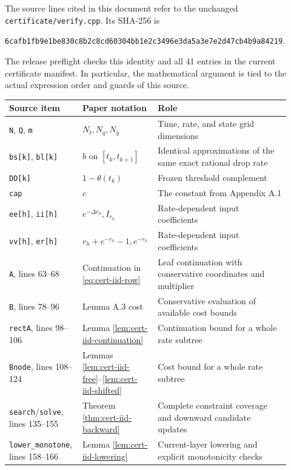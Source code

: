 The source lines cited in this document refer to the unchanged
\texttt{certificate/verify.cpp}. Its SHA-256 is
\begin{center}
\small\texttt{6cafb1fb9e1be830c8b2c8cd60304bb1e2c3496e3da5a3e7e2d47cb4b9a84219}.
\end{center}
The release preflight checks this identity and all 41 entries in the
current certificate manifest. In particular, the mathematical argument is tied to
the actual expression order and guards of this source.

\begin{longtable}{@{}p{0.25\linewidth}p{0.21\linewidth}p{0.46\linewidth}@{}}
\toprule
Source item & Paper notation & Role\\
\midrule
\endhead
\texttt{N}, \texttt{Q}, \texttt{m} & $N_t,N_q,N_y$ & Time, rate, and state grid dimensions\\
\texttt{bs[k]}, \texttt{bl[k]} & $b$ on $[t_k,t_{k+1}]$ & Identical approximations of the same exact rational drop rate\\
\texttt{DD[k]} & $1-\theta(t_k)$ & Frozen threshold complement\\
\texttt{cap} & $c$ & The constant from Appendix A.1\\
\texttt{ee[h]}, \texttt{ii[h]} & $e^{-\Delta r_h},I_{r_h}$ & Rate-dependent input coefficients\\
\texttt{vv[h]}, \texttt{er[h]} & $r_h+e^{-r_h}-1,e^{-r_h}$ & Rate-dependent input coefficients\\
\texttt{A}, lines 63--68 & Continuation in \eqref{eq:cert-iid-row} & Leaf continuation with conservative coordinates and multiplier\\
\texttt{B}, lines 78--96 & Lemma A.3 cost & Conservative evaluation of available cost bounds\\
\texttt{rectA}, lines 98--106 & Lemma \ref{lem:cert-iid-continuation} & Continuation bound for a whole rate subtree\\
\texttt{Bnode}, lines 108--124 & Lemmas \ref{lem:cert-iid-free}--\ref{lem:cert-iid-shifted} & Cost bound for a whole rate subtree\\
\texttt{search}/\texttt{solve}, lines 135--155 & Theorem \ref{thm:cert-iid-backward} & Complete constraint coverage and downward candidate updates\\
\texttt{lower\_monotone}, lines 158--166 & Lemma \ref{lem:cert-iid-lowering} & Current-layer lowering and explicit monotonicity checks\\
\bottomrule
\end{longtable}

